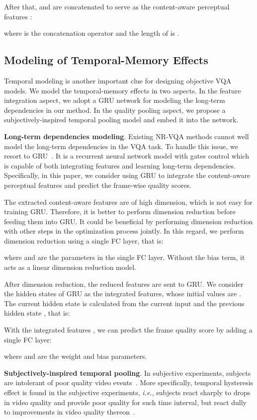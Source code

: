 \documentclass[sigconf]{acmart}
\begin{document}
After that,  and  are concatenated to serve as the content-aware perceptual features :

where  is the concatenation operator and the length of  is .

\subsection{Modeling of Temporal-Memory Effects}

Temporal modeling is another important clue for designing objective VQA models. We model the temporal-memory effects in two aspects. In the feature integration aspect, we adopt a GRU network for modeling the long-term dependencies in our method. In the quality pooling aspect, we propose a subjectively-inspired temporal pooling model and embed it into the network.

\textbf{Long-term dependencies modeling}.
Existing NR-VQA methods cannot well model the long-term dependencies in the VQA task. 
To handle this issue, we resort to GRU~\cite{cho2014learning}. It is a recurrent neural network model with gates control which is capable of both integrating features and learning long-term dependencies. 
Specifically, in this paper, we consider using GRU to integrate the content-aware perceptual features and predict the frame-wise quality scores.

The extracted content-aware features are of high dimension, which is not easy for training GRU. 
Therefore, it is better to perform dimension reduction before feeding them into GRU. 
It could be beneficial by performing dimension reduction with other steps in the optimization process jointly. 
In this regard, we perform dimension reduction using a single FC layer, that is:

where  and  are the parameters in the single FC layer. 
Without the bias term, it acts as a linear dimension reduction model.

After dimension reduction, the reduced features  are sent to GRU. 
We consider the hidden states of GRU as the integrated features, whose initial values are . 
The current hidden state  is calculated from the current input  and the previous hidden state , that is:




With the integrated features , we can predict the frame quality score  by adding a single FC layer:

where  and  are the weight and bias parameters.

\textbf{Subjectively-inspired temporal pooling}.
In subjective experiments, subjects are intolerant of poor quality video events~\cite{park2013video}. 
More specifically, temporal hysteresis effect is found in the subjective experiments, \textit{i.e.}, subjects react sharply to drops in video quality and provide poor quality for such time interval, but react dully to improvements in video quality thereon~\cite{seshadrinathan2011temporal}. 
\end{document}
